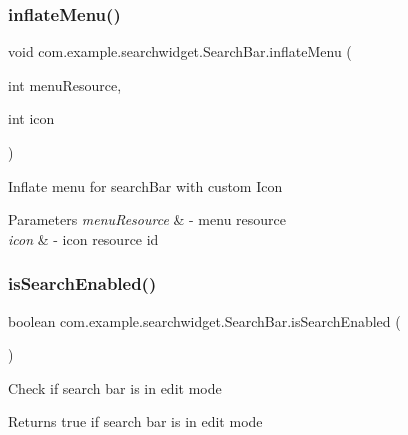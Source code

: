 \subsubsection{\texorpdfstring{inflateMenu()}{inflateMenu()}\hspace{0.1cm}{\footnotesize\ttfamily [2/2]}}
{\footnotesize\ttfamily void com.\+example.\+searchwidget.\+Search\+Bar.\+inflate\+Menu (\begin{DoxyParamCaption}\item[{int}]{menu\+Resource,  }\item[{int}]{icon }\end{DoxyParamCaption})}

Inflate menu for search\+Bar with custom Icon


\begin{DoxyParams}{Parameters}
{\em menu\+Resource} & -\/ menu resource \\
\hline
{\em icon} & -\/ icon resource id \\
\hline
\end{DoxyParams}
\mbox{\label{classcom_1_1example_1_1searchwidget_1_1_search_bar_a101525ef181280109b31396c3175c91c}} 
\subsubsection{\texorpdfstring{isSearchEnabled()}{isSearchEnabled()}}
{\footnotesize\ttfamily boolean com.\+example.\+searchwidget.\+Search\+Bar.\+is\+Search\+Enabled (\begin{DoxyParamCaption}{ }\end{DoxyParamCaption})}

Check if search bar is in edit mode

\begin{DoxyReturn}{Returns}
true if search bar is in edit mode 
\end{DoxyReturn}
\mbox{\label{classcom_1_1example_1_1searchwidget_1_1_search_bar_a1bf37ff1703370a852d5573dfffe5daf}} 
